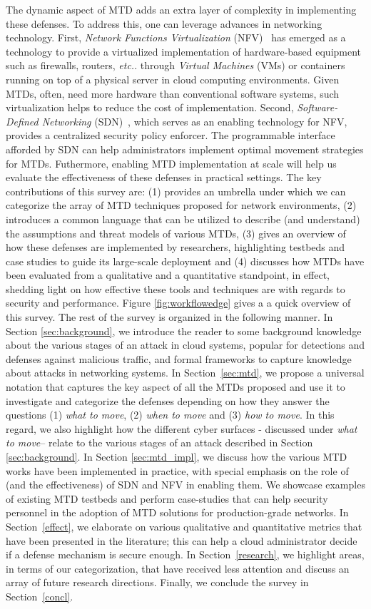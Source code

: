 The dynamic aspect of MTD adds an extra layer of complexity in implementing these defenses. To address this, one can leverage advances in networking technology. First, \emph{Network Functions Virtualization} (NFV)~ has emerged as a technology to provide a virtualized implementation of hardware-based equipment such as firewalls, routers, {\em etc.}. through \emph{Virtual Machines} (VMs) or containers running on top of a physical server in cloud computing environments. Given MTDs, often, need more hardware than conventional software systems, such virtualization helps to reduce the cost of implementation.
Second, \emph{Software-Defined Networking} (SDN)~, which serves as an enabling technology for NFV, provides a centralized security policy enforcer. The programmable interface afforded by SDN can help administrators implement optimal movement strategies for MTDs.
Futhermore, enabling MTD implementation at scale will help us evaluate the effectiveness of these defenses in practical settings.
The key contributions of this survey are: (1) provides an umbrella under which we can categorize the array of MTD techniques proposed for network environments, (2) introduces a common language that can be utilized to describe (and understand) the assumptions and threat models of various MTDs, (3) gives an overview of how these defenses are implemented by researchers, highlighting testbeds and case studies to guide its large-scale deployment and (4) discusses how MTDs have been evaluated from a qualitative and a quantitative standpoint, in effect, shedding light on how effective these tools and techniques are with regards to security and performance. Figure \ref{fig:workflowedge} gives a a quick overview of this survey.
The rest of the survey is organized in the following manner. In Section \ref{sec:background}, we introduce the reader to some background knowledge about the various stages of an attack in cloud systems, popular for detections and defenses against malicious traffic, and formal frameworks to capture knowledge about attacks in networking systems. In Section~\ref{sec:mtd}, we propose a universal notation that captures the key aspect of all the MTDs proposed and use it to investigate and categorize the defenses depending on how they answer the questions (1) \emph{what to move}, (2) \emph{when to move} and (3) \emph{how to move}. In this regard, we also highlight how the different cyber surfaces - discussed under {\em what to move}-- relate to the various stages of an attack described in Section \ref{sec:background}. In Section \ref{sec:mtd_impl}, we discuss how the various MTD works have been implemented in practice, with special emphasis on the role of (and the effectiveness) of SDN and NFV in enabling them. We showcase examples of existing MTD testbeds and perform case-studies that can help security personnel in the adoption of MTD solutions for production-grade networks.  In Section~\ref{effect}, we elaborate on various qualitative and quantitative metrics that have been presented in the literature; this can help a cloud administrator decide if a defense mechanism is secure enough. In Section~\ref{research}, we highlight areas, in terms of our categorization, that have received less attention and discuss an array of future research directions. Finally, we conclude the survey in Section~\ref{concl}.

